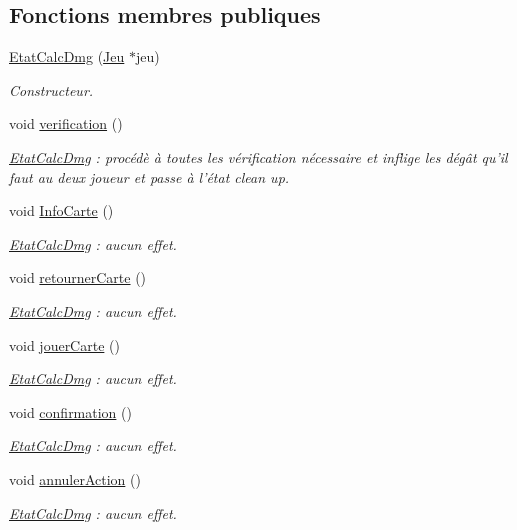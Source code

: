 \subsection*{Fonctions membres publiques}
\begin{DoxyCompactItemize}
\item 
\hyperlink{class_etat_calc_dmg_ab5d3054fd32a3a29c6c234b577cbf8d4}{Etat\-Calc\-Dmg} (\hyperlink{class_jeu}{Jeu} $\ast$jeu)
\begin{DoxyCompactList}\small\item\em Constructeur. \end{DoxyCompactList}\item 
void \hyperlink{class_etat_calc_dmg_abddaaca7a79022a6521e893003240de1}{verification} ()
\begin{DoxyCompactList}\small\item\em \hyperlink{class_etat_calc_dmg}{Etat\-Calc\-Dmg} \-: procédè à toutes les vérification nécessaire et inflige les dégât qu'il faut au deux joueur et passe à l'état clean up. \end{DoxyCompactList}\item 
void \hyperlink{class_etat_calc_dmg_a3d68b599faab01efda64cf48a336ec29}{Info\-Carte} ()
\begin{DoxyCompactList}\small\item\em \hyperlink{class_etat_calc_dmg}{Etat\-Calc\-Dmg} \-: aucun effet. \end{DoxyCompactList}\item 
void \hyperlink{class_etat_calc_dmg_a5b089ca3e4773afc4503106effe36866}{retourner\-Carte} ()
\begin{DoxyCompactList}\small\item\em \hyperlink{class_etat_calc_dmg}{Etat\-Calc\-Dmg} \-: aucun effet. \end{DoxyCompactList}\item 
void \hyperlink{class_etat_calc_dmg_a67193b64493418f62457259688fbe402}{jouer\-Carte} ()
\begin{DoxyCompactList}\small\item\em \hyperlink{class_etat_calc_dmg}{Etat\-Calc\-Dmg} \-: aucun effet. \end{DoxyCompactList}\item 
void \hyperlink{class_etat_calc_dmg_a6b33fa83c3897ce65ed53b6b345615c1}{confirmation} ()
\begin{DoxyCompactList}\small\item\em \hyperlink{class_etat_calc_dmg}{Etat\-Calc\-Dmg} \-: aucun effet. \end{DoxyCompactList}\item 
void \hyperlink{class_etat_calc_dmg_af9ef4c658d2591d25e03fabaa5d9bca1}{annuler\-Action} ()
\begin{DoxyCompactList}\small\item\em \hyperlink{class_etat_calc_dmg}{Etat\-Calc\-Dmg} \-: aucun effet. \end{DoxyCompactList}\end{DoxyCompactItemize}


